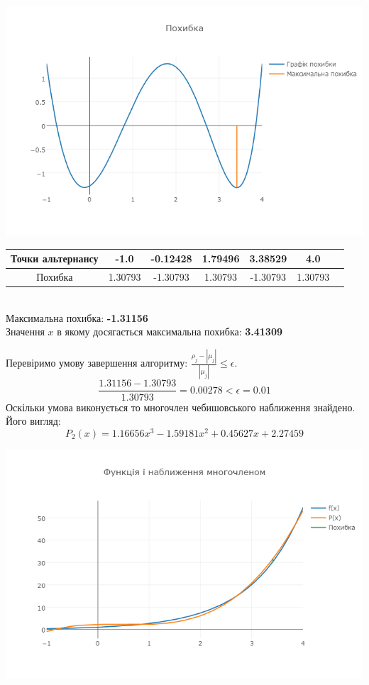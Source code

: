 \documentclass[ukrainian,14pt]{extarticle}
\begin{document}
\includegraphics[scale=0.65]{exp_err4}
\begin{tabular}{|c|c|c|c|c|c|c}
\hline
\rule{0pt}{4ex} 
Точки альтернансу & -1.0 & -0.12428 & 1.79496 & 3.38529 & 4.0 \\\hline
\rule{0pt}{4ex} 
Похибка & 1.30793 & -1.30793 & 1.30793 & -1.30793 & 1.30793  \\ \hline 
\end{tabular}\\

\noindent
Максимальна похибка: \textbf{-1.31156}\\
Значення $x$ в якому досягається максимальна похибка: \textbf{3.41309}

\newpage

Перевіримо умову завершення алгоритму: $\frac{\rho_j - |\mu_j|}{|\mu_j|} \leq \epsilon.$ \\

$$\frac{1.31156 - 1.30793}{1.30793} = 0.00278 < \epsilon = 0.01$$
Оскільки умова виконується  то многочлен чебишовського наближення знайдено. Його вигляд:\\
$$P_2(x) = 1.16656 x^{3} - 1.59181 x^{2} + 0.45627 x + 2.27459$$

\includegraphics[scale=0.7]{exp}
\end{document}
